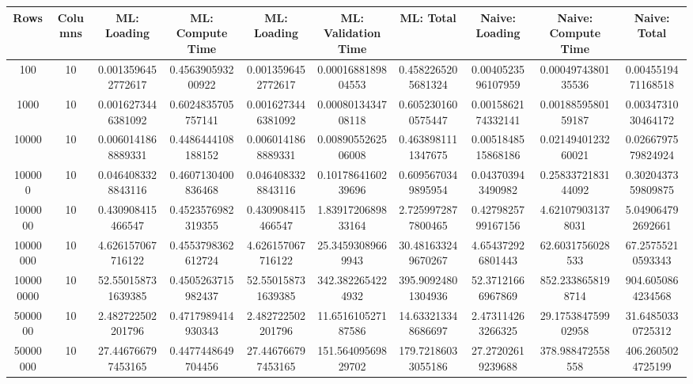 \begin{table}[htb]
    \centering
    \begin{tabular}{@{}cccccccccc@{}}
        \toprule
        Rows & Columns & ML: Loading & ML: Compute Time & ML: Loading & ML: Validation Time & ML: Total & Naive: Loading & Naive: Compute Time & Naive: Total \\
        \midrule
        100 & 10 & 0.0013596452772617 & 0.456390593200922 & 0.0013596452772617 & 0.0001688189804553 & 0.4582265205681324 & 0.0040523596107959 & 0.0004974380135536 & 0.0045519471168518 \\
        1000 & 10 & 0.0016273446381092 & 0.6024835705757141 & 0.0016273446381092 & 0.0008013434708118 & 0.6052301600575447 & 0.0015862174332141 & 0.0018859580159187 & 0.0034731030464172 \\
        10000 & 10 & 0.0060141868889331 & 0.4486444108188152 & 0.0060141868889331 & 0.0089055262506008 & 0.4638981111347675 & 0.0051848515868186 & 0.0214940123260021 & 0.0266797579824924 \\
        100000 & 10 & 0.0464083328843116 & 0.4607130400836468 & 0.0464083328843116 & 0.1017864160239696 & 0.6095670349895954 & 0.043703943490982 & 0.2583372183144092 & 0.3020437359809875 \\
        1000000 & 10 & 0.430908415466547 & 0.4523576982319355 & 0.430908415466547 & 1.8391720689833164 & 2.7259972877800465 & 0.4279825799167156 & 4.621079031378031 & 5.049064792692661 \\
        10000000 & 10 & 4.626157067716122 & 0.4553798362612724 & 4.626157067716122 & 25.34593089669943 & 30.481633249670267 & 4.654372926801443 & 62.6031756028533 & 67.25755210593343 \\
        100000000 & 10 & 52.550158731639385 & 0.4505263715982437 & 52.550158731639385 & 342.3822654224932 & 395.90924801304936 & 52.37121666967869 & 852.2338658198714 & 904.6050864234568 \\
        5000000 & 10 & 2.482722502201796 & 0.4717989414930343 & 2.482722502201796 & 11.651610527187586 & 14.633213348686697 & 2.473114263266325 & 29.175384759902958 & 31.64850330725312 \\
        50000000 & 10 & 27.446766797453165 & 0.4477448649704456 & 27.446766797453165 & 151.56409569829702 & 179.72186033055186 & 27.27202619239688 & 378.988472558558 & 406.2605024725199 \\
        \bottomrule
    \end{tabular}
\end{table}